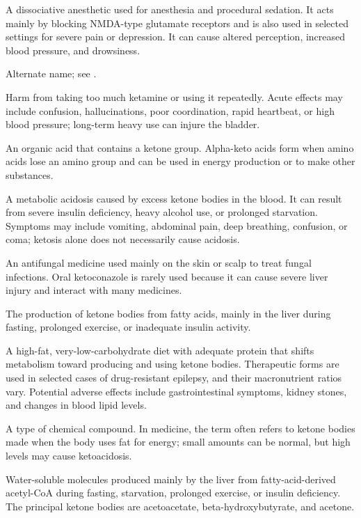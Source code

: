  A dissociative anesthetic used for anesthesia and procedural sedation. It acts mainly by blocking NMDA-type glutamate receptors and is also used in selected settings for severe pain or depression. It can cause altered perception, increased blood pressure, and drowsiness.

 Alternate name; see .

 Harm from taking too much ketamine or using it repeatedly. Acute effects may include confusion, hallucinations, poor coordination, rapid heartbeat, or high blood pressure; long-term heavy use can injure the bladder.

 An organic acid that contains a ketone group. Alpha-keto acids form when amino acids lose an amino group and can be used in energy production or to make other substances.

 A metabolic acidosis caused by excess ketone bodies in the blood. It can result from severe insulin deficiency, heavy alcohol use, or prolonged starvation. Symptoms may include vomiting, abdominal pain, deep breathing, confusion, or coma; ketosis alone does not necessarily cause acidosis.

 An antifungal medicine used mainly on the skin or scalp to treat fungal infections. Oral ketoconazole is rarely used because it can cause severe liver injury and interact with many medicines.

 The production of ketone bodies from fatty acids, mainly in the liver during fasting, prolonged exercise,
or inadequate insulin activity.

 A high-fat, very-low-carbohydrate diet with adequate protein that shifts metabolism toward producing and using ketone bodies.
Therapeutic forms are used in selected cases of drug-resistant epilepsy, and their macronutrient
ratios vary. Potential adverse effects include gastrointestinal symptoms, kidney stones, and
changes in blood lipid levels.

 A type of chemical compound. In medicine, the term often refers to ketone bodies made when the body uses fat for energy; small amounts can be normal, but high levels may cause ketoacidosis.

 Water-soluble molecules produced mainly by the liver from fatty-acid-derived acetyl-CoA
during fasting, starvation, prolonged exercise, or insulin deficiency. The principal
ketone bodies are acetoacetate, beta-hydroxybutyrate, and acetone.

